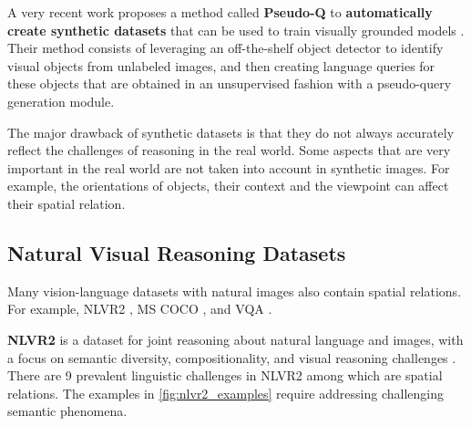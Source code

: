 A very recent work proposes a method called \textbf{Pseudo-Q} to \textbf{automatically create synthetic datasets} that can be used to train visually grounded models \cite{jiang2022pseudo}. Their method consists of leveraging an off-the-shelf object detector to identify visual objects from unlabeled images, and then creating language queries for these objects that are obtained in an unsupervised fashion with a pseudo-query generation module.

The major drawback of synthetic datasets is that they do not always accurately reflect the challenges of reasoning in the real world. Some aspects that are very important in the real world are not taken into account in synthetic images. For example, the orientations of objects, their context and the viewpoint can affect their spatial relation.

\subsection{Natural Visual Reasoning Datasets} \label{sec:natural_visual_reasoning_datasets}

Many vision-language datasets with natural images also contain spatial relations. For example, NLVR2 \cite{suhr2018corpus}, MS COCO \cite{lin2014microsoft}, and VQA \cite{antol2015vqa}.

\textbf{NLVR2} is a dataset for joint reasoning about natural language and images, with a focus on semantic diversity, compositionality, and visual reasoning challenges \cite{suhr2018corpus}. There are 9 prevalent linguistic challenges in NLVR2 among which are spatial relations.
The examples in \cref{fig:nlvr2_examples} require addressing challenging semantic phenomena.

